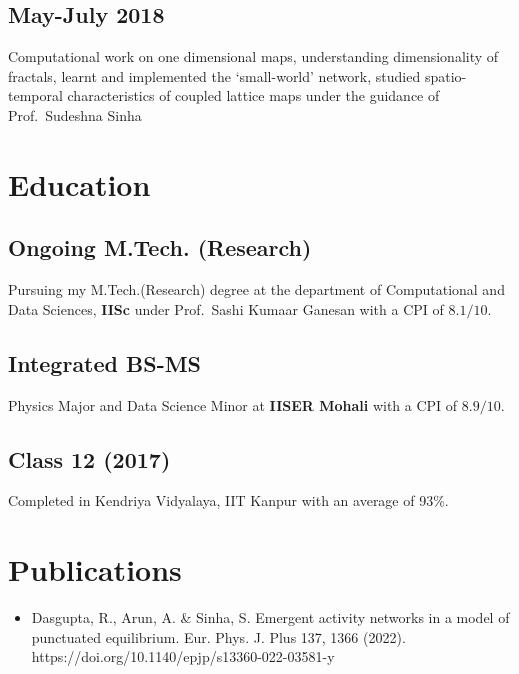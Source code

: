 \documentclass{article}
\begin{document}

\subsection{May-July 2018}

Computational work on one dimensional maps,
understanding dimensionality of fractals,
learnt and implemented the `small-world' network,
studied spatio-temporal characteristics
of coupled lattice maps
under the guidance of Prof.~Sudeshna Sinha

\section{Education}

\subsection{Ongoing M.Tech. (Research)}
Pursuing my M.Tech.(Research) degree at the
department of Computational and Data Sciences, {\bf IISc}
under Prof.~Sashi Kumaar Ganesan
with a CPI of $8.1 / 10$.

\subsection{Integrated BS-MS}
Physics Major and Data Science Minor
at {\bf IISER Mohali} with a CPI of $8.9 / 10$.

\subsection{Class 12 (2017)} 
Completed in Kendriya Vidyalaya, IIT Kanpur
with an average of 93\%.

\section{Publications}

\begin{itemize}
  \item
Dasgupta, R., Arun, A. \& Sinha, S. Emergent activity networks in a model of punctuated equilibrium. Eur. Phys. J. Plus 137, 1366 (2022). https://doi.org/10.1140/epjp/s13360-022-03581-y
\end{itemize}
\end{document}
